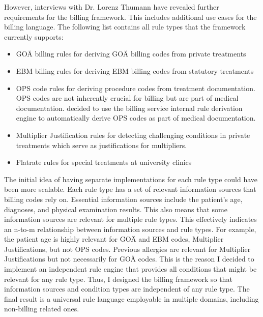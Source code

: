 However, interviews with Dr. Lorenz Thumann have revealed further requirements for the billing framework.
This includes additional use cases for the billing language.
The following list contains all rule types that the framework currently supports:
\begin{itemize}
    \item GOÄ billing rules for deriving GOÄ billing codes from private treatments
    \item EBM billing rules for deriving EBM billing codes from statutory treatments
    \item OPS code rules for deriving procedure codes from treatment documentation.
    OPS codes are not inherently crucial for billing but are part of medical documentation.
    \AV decided to use the billing service internal rule derivation engine to automatically derive OPS codes as part of medical documentation.
    \item Multiplier Justification rules for detecting challenging conditions in private treatments
    which serve as justifications for multipliers.
    \item Flatrate rules for special treatments at university clinics
\end{itemize}


The initial idea of having separate implementations for each rule type could have been more scalable.
Each rule type has a set of relevant information sources that billing codes rely on.
Essential information sources include the patient's age, diagnoses, and physical examination results.
This also means that some information sources are relevant for multiple rule types.
This effectively indicates an n-to-m relationship between information sources and rule types.
For example, the patient age is highly relevant for GOÄ and EBM codes, Multiplier Justifications, but not OPS codes.
Previous allergies are relevant for Multiplier Justifications but not necessarily for GOÄ codes.
This is the reason I decided to implement an independent rule engine that provides all conditions that might be relevant for any rule type.
Thus, I designed the billing framework so that information sources and condition types are independent of any rule type.
The final result is a universal rule language employable in multiple domains, including non-billing related ones.


